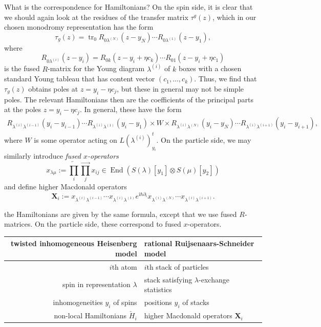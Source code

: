 \documentclass[11pt]{report}
\theoremstyle{definition}
\theoremstyle{remark}
\theoremstyle{remark}
\newcommand{\I}{\mathrm{i}}
\begin{document}
What is the correspondence for Hamiltonians? On the spin side, it is clear that we should again look at the residues of the transfer matrix $\tau^g(z)$, which in our chosen monodromy representation has the form
\begin{equation*}
\tau_g(z) = \operatorname{tr}_0 R_{0\lambda^{(N)}}(z-y_N) \cdots R_{0\lambda^{(1)}}(z-y_1),
\end{equation*}
where
\begin{equation*}
R_{0\lambda^{(i)}}(z-y_i) = R_{0k}(z-y_i+\eta c_k) \cdots R_{01}(z-y_i+\eta c_1)
\end{equation*}
is the fused $R$-matrix for the Young diagram $\lambda^{(i)}$ of $k$ boxes with a chosen standard Young tableau that has content vector $(c_1,...,c_k)$. Thus, we find that $\tau_g(z)$ obtains poles at $z = y_i-\eta c_j$, but these in general may not be simple poles. The relevant Hamiltonians then are the coefficients of the principal parts at the poles $z = y_i-\eta c_j$. In general, these have the form
\begin{align*}
R_{\lambda^{(i)}\lambda^{(i-1)}}(y_i-y_{i-1}) \cdots R_{\lambda^{(i)}\lambda^{(1)}}(y_i-y_1) \times W \times R_{\lambda^{(i)}\lambda^{(N)}}(y_i-y_N) \cdots R_{\lambda^{(i)}\lambda^{(i+1)}}(y_i-y_{i+1}),
\end{align*}
where $W$ is some operator acting on $L(\lambda^{(i)})_{y_i}^t$. On the particle side, we may similarly introduce \emph{fused $x$-operators}
\begin{equation*}
x_{\lambda \mu} := \overleftarrow{\prod_i} \overrightarrow{\prod_j} x_{ij} \in \operatorname{End}(S(\lambda)[y_1] \otimes S(\mu)[y_2])
\end{equation*}
and define higher Macdonald operators
\begin{equation*}
\mathbf{X}_i := x_{\lambda^{(i)}\lambda^{(i-1)}} \cdots x_{\lambda^{(i)}\lambda^{(1)}} e^{\I\hbar\partial_i} x_{\lambda^{(i)}\lambda^{(N)}} \cdots x_{\lambda^{(i)}\lambda^{(i+1)}}.
\end{equation*}

 the Hamiltonians are given by the same formula, except that we use fused $R$-matrices. On the particle side, these correspond to fused $x$-operators.

\begin{center}
\begin{tabular}{|r||l|}
\hline
twisted inhomogeneous Heisenberg model & rational Ruijsenaars-Schneider model \\
\hline
$i$th atom & $i$th stack of particles \\
spin in representation $\lambda$ & stack satisfying $\lambda$-exchange statistics \\
inhomogeneities $y_i$ of spins & positions $y_i$ of stacks \\
non-local Hamiltonians $\check H_i$ & higher Macdonald operators $\mathbf{X}_i$ \\
\hline
\end{tabular}
\end{center}
\end{document}
